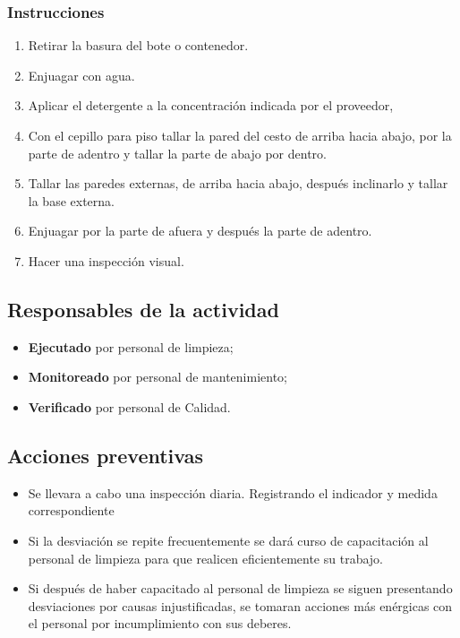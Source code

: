 \subsubsection{Instrucciones}

\begin{enumerate}
	\item Retirar la basura del bote o contenedor.
	\item Enjuagar con agua.
	\item Aplicar el detergente a la concentración indicada por el proveedor,
	\item Con el cepillo para piso tallar la pared del cesto de arriba hacia abajo, por la parte de adentro y tallar la parte de abajo por dentro.
	\item Tallar las paredes externas, de arriba hacia abajo, después inclinarlo y tallar la base externa.
	\item Enjuagar por la parte de afuera y después la parte de adentro.
	\item Hacer una inspección visual.
\end{enumerate}

\subsection{Responsables de la actividad}

\begin{itemize}
	\item \textbf{Ejecutado} por personal de limpieza;
	\item \textbf{Monitoreado} por personal de mantenimiento;
	\item \textbf{Verificado} por personal de Calidad.
\end{itemize}

\subsection{Acciones preventivas}

\begin{itemize}
	\item Se llevara a cabo una inspección diaria. Registrando el indicador y medida correspondiente
	\item Si la desviación se repite frecuentemente se dará curso de capacitación al personal de limpieza para que realicen eficientemente su trabajo.
	\item Si después de haber capacitado al personal de limpieza se siguen presentando desviaciones por causas injustificadas, se tomaran acciones más enérgicas con el personal por incumplimiento con sus deberes.
\end{itemize}

